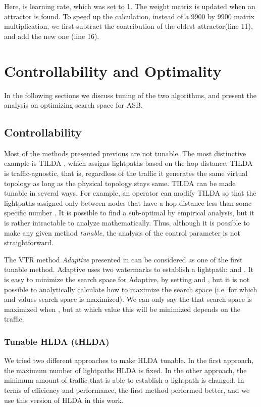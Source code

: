 \documentclass[conference]{IEEEtran}
\begin{document}
Here,  is 
learning rate, which was set to 1. The weight matrix is updated when an attractor is found. 
To speed up the calculation, instead of a 9900 by 9900 matrix multiplication, we first subtract the contribution of the oldest attractor(line 11), and add the new one (line 16).
\section{Controllability and Optimality}\label{methodology}
In the following sections we discuss tuning of the two algorithms, and present the analysis on optimizing search space for ASB.
 
\subsection{Controllability}
Most of the methods presented previous are not tunable.  
The most distinctive example is TILDA \cite{Ramaswami:DLTW96}, which assigns lightpaths based 
on the hop distance. TILDA is traffic-agnostic, that is, regardless of the traffic it generates the same virtual topology
as long as the physical topology stays same. TILDA can be made tunable  in several ways.
For example, an operator can modify TILDA so that the lightpaths assigned only between nodes that have a hop distance less than some specific number .
It is possible to find a  sub-optimal  by empirical analysis, but it is rather intractable to analyze mathematically.
Thus, although it is possible to make any given method {\em tunable}, 
the analysis of the control parameter is not straightforward.

The VTR method {\em Adaptive} presented in \cite{gencata:virtual-topology} can be considered as one of the first tunable method.
Adaptive uses two watermarks to establish a lightpath:  and . 
It is easy to minimize the search space for Adaptive, by setting  and , but it is not 
possible to analytically calculate how to maximize the search space (i.e. for which  and  values search space is maximized).
We can only say the that search space is maximized when , but at which value this will be minimized depends on the traffic.




\subsubsection{Tunable HLDA (tHLDA)}
We tried two different approaches to make HLDA tunable. In the first approach, the maximum 
number of lightpaths HLDA is fixed. In the other approach, the minimum amount of traffic that is able to establish a lightpath
is changed. In terms of efficiency and performance, the first method performed better, and we use this version of HLDA in this work. 
 
\end{document}

